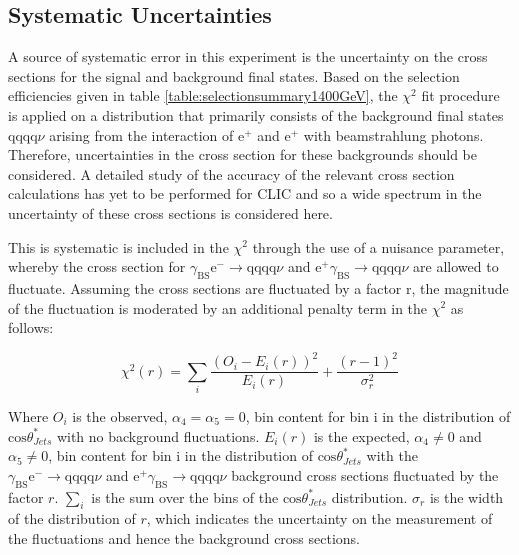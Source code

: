 
\subsection{Systematic Uncertainties}
A source of systematic error in this experiment is the uncertainty on the cross sections for the signal and background final states.  Based on the selection efficiencies given in table \ref{table:selectionsummary1400GeV}, the $\chi^{2}$ fit procedure is applied on a distribution that primarily consists of the background final states $\text{qqqq}\nu$ arising from the interaction of $\text{e}^{+}$ and $\text{e}^{+}$ with beamstrahlung photons.  Therefore, uncertainties in the cross section for these backgrounds should be considered.  A detailed study of the accuracy of the relevant cross section calculations has yet to be performed for CLIC and so a wide spectrum in the uncertainty of these cross sections is considered here.   

This is systematic is included in the $\chi^{2}$ through the use of a nuisance parameter, whereby the cross section for $\gamma_{\text{BS}}\text{e}^{-} \rightarrow \text{qqqq}\nu$ and $\text{e}^{+}\gamma_{\text{BS}} \rightarrow \text{qqqq}\nu$ are allowed to fluctuate.  Assuming the cross sections are fluctuated by a factor r, the magnitude of the fluctuation is moderated by an additional penalty term in the $\chi^{2}$ as follows:

\begin{equation}
\chi^{2}(r) = \sum_{i} \frac{(O_{i} - E_{i}(r))^{2}}{E_{i}(r)} + \frac{(r-1)^{2}}{\sigma_{r}^{2}} 
\end{equation}

Where $O_{i}$ is the observed, $\alpha_{4} = \alpha_{5} = 0$, bin content for bin i in the distribution of $\text{cos}\theta^{*}_{Jets}$ with no background fluctuations.  $E_{i}(r)$ is the expected, $\alpha_{4} \neq 0$ and $\alpha_{5} \neq 0$, bin content for bin i in the distribution of $\text{cos}\theta^{*}_{Jets}$ with the $\gamma_{\text{BS}}\text{e}^{-} \rightarrow \text{qqqq}\nu$ and $\text{e}^{+}\gamma_{\text{BS}} \rightarrow \text{qqqq}\nu$ background cross sections fluctuated by the factor $r$.  $\sum_{i}$ is the sum over the bins of the $\text{cos}\theta^{*}_{Jets}$ distribution.  $\sigma_{r}$ is the width of the distribution of $r$, which indicates the uncertainty on the measurement of the fluctuations and hence the background cross sections.

